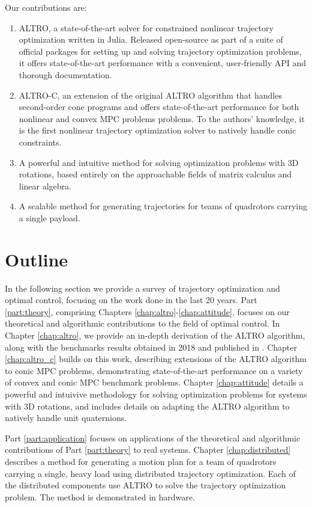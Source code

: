 \documentclass[../root.tex]{subfiles}
\begin{document}
Our contributions are:
\begin{enumerate}
    \item ALTRO, a state-of-the-art solver for constrained nonlinear trajectory 
    optimization written in Julia. Released open-source as part of a suite of 
    official packages for setting up and solving trajectory optimization problems,
    it offers state-of-the-art performance with a convenient, user-friendly API 
    and thorough documentation.
    \item ALTRO-C, an extension of the original ALTRO algorithm that handles
    second-order cone programs and offers state-of-the-art performance for
    both nonlinear and convex MPC problems problems. To the authors'
    knowledge, it is the first nonlinear trajectory optimization solver to
    natively handle conic constraints.
    \item A powerful and intuitive method for solving optimization problems with 
    3D rotations, based entirely on the approachable fields of matrix calculus
    and linear algebra.
    \item A scalable method for generating trajectories for teams of quadrotors
    carrying a single payload.
\end{enumerate}

\section{Outline}

In the following section we provide a survey of trajectory optimization and
optimal control, focusing on the work done in the last 20 years. Part
\ref{part:theory}, comprising Chapters
\ref{chap:altro}-\ref{chap:attitude}, focuses on our theoretical and
algorithmic contributions to the field of optimal control. In Chapter
\ref{chap:altro}, we provide an in-depth derivation of the ALTRO algorithm, along
with the benchmarks results obtained in 2018 and published in
\cite{howell_ALTRO_2019}. Chapter \ref{chap:altro_c} builds on this work,
describing extensions of the ALTRO algorithm to conic MPC problems,
demonstrating state-of-the-art performance on a variety of convex and conic MPC 
benchmark problems.
Chapter \ref{chap:attitude} details a powerful and intuivive methodology 
for solving optimization problems for systems with 3D rotations, and includes
details on adapting the ALTRO algorithm to natively handle unit quaternions. 

Part \ref{part:application} focuses on applications of the theoretical and 
algorithmic contributions of Part \ref{part:theory} to real systems. 
Chapter \ref{chap:distributed} describes a method for generating a 
motion plan for a team of quadrotors carrying a single, heavy load using 
distributed trajectory optimization. Each of the distributed components 
use ALTRO to solve the trajectory optimization problem. The method 
is demonstrated in hardware.
\end{document}
